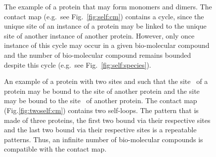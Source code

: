\documentclass{entcs}
\begin{document}
\begin{figure}
\caption{The example of a protein that may form monomers and dimers.
The contact map (e.g.~see Fig.~\ref{fig:self:cm}) contains a cycle, since the unique site of an instance of a  protein may be linked to the unique site of another instance of another protein. However, only once instance of this cycle may occur in a given bio-molecular compound and the number of bio-molecular compound remains bounded despite this cycle (e.g.~see Fig.~\ref{fig:self:species}).}
\end{figure}

\begin{figure}
\caption{An example of a protein with two sites  and  such that the site {}\;\; of a protein may be bound to the site  of another protein and the site  may be bound to the site \;\; of another protein.
The contact map (Fig.\ref{fig:twoself:cm}) contains two self-loops.
The pattern that is made of three proteins, the first two bound via their respective sites  and the last two bound via their respective sites  is a repeatable patterns. Thus, an infinite number of bio-molecular compounds is compatible with the contact map.  }
\end{figure}
\end{document}
